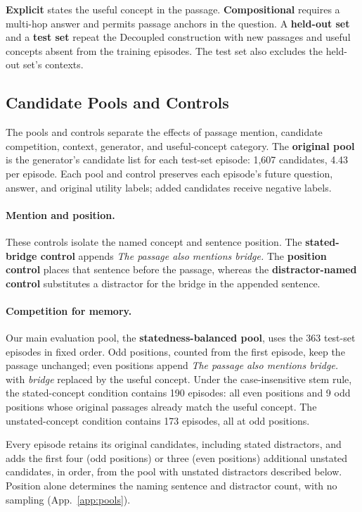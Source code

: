 \textbf{Explicit} states the useful concept in the passage.
\textbf{Compositional} requires a multi-hop answer and permits passage
anchors in the question. A \textbf{held-out set} and a
\textbf{test set} repeat the Decoupled construction with new passages
and useful concepts absent from the training episodes. The test set
also excludes the held-out set's contexts.

\subsection{Candidate Pools and Controls}

The pools and controls separate the effects of passage mention,
candidate competition, context, generator, and useful-concept category.
The \textbf{original pool} is the generator's candidate list for each
test-set episode: 1,607 candidates, 4.43 per episode.
Each pool and control preserves each episode's future question,
answer, and original utility labels; added candidates receive
negative labels.

\paragraph{Mention and position.}
These controls isolate the named concept and sentence position.
The \textbf{stated-bridge control} appends \emph{The passage also
mentions bridge.} The \textbf{position control} places that sentence
before the passage, whereas the \textbf{distractor-named control}
substitutes a distractor for the bridge in the appended sentence.

\paragraph{Competition for memory.}
Our main evaluation pool, the \textbf{statedness-balanced pool}, uses
the 363 test-set episodes in fixed order. Odd positions, counted from
the first episode, keep the passage unchanged; even positions append
\emph{The passage also mentions bridge.} with \emph{bridge} replaced
by the useful concept. Under the case-insensitive stem rule, the
stated-concept condition contains 190 episodes: all even positions
and 9 odd positions whose original passages already match the useful
concept. The unstated-concept condition contains 173 episodes, all
at odd positions.

Every episode retains its original candidates, including stated
distractors, and adds the first four (odd positions) or three (even
positions) additional unstated candidates, in order, from the pool
with unstated distractors described below. Position alone determines
the naming sentence and distractor count, with no sampling
(App.~\ref{app:pools}).

